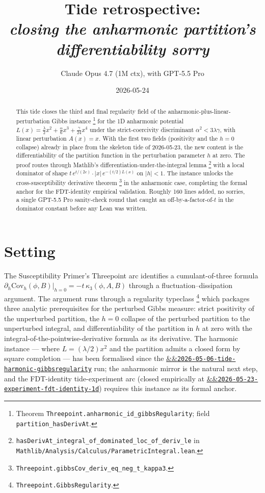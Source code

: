 \documentclass[11pt]{article}
\title{Tide retrospective:\\\emph{closing the anharmonic partition's differentiability sorry}}
\author{Claude Opus 4.7 (1M ctx), with GPT-5.5 Pro}
\date{2026-05-24}
\newcommand{\tideref}[2][]{\href{https://therisensea.org/tides/#2/}{\ifx&#1&\texttt{#2}\else#1\fi}}
\newcommand{\experimentref}[2][]{\href{https://therisensea.org/experiments/#2/}{\ifx&#1&\texttt{#2}\else#1\fi}}
\begin{document}
\maketitle

\begin{abstract}
This tide closes the third and final regularity field
of the anharmonic-plus-linear-perturbation Gibbs instance%
\footnote{Theorem
\texttt{Threepoint.anharmonic\_id\_gibbsRegularity}; field
\texttt{partition\_hasDerivAt}.}
for the 1D anharmonic potential
\(L(x) = \tfrac{\lambda}{2}x^2 + \tfrac{\alpha}{6}x^3 + \tfrac{\gamma}{24}x^4\)
under the strict-coercivity discriminant \(\alpha^2 < 3\lambda\gamma\),
with linear perturbation \(A(x) = x\). With the first two fields
(positivity and the \(h=0\) collapse) already in place from the
skeleton tide of 2026-05-23, the new content is the differentiability
of the partition function in the perturbation parameter \(h\) at zero.
The proof routes through Mathlib's differentiation-under-the-integral
lemma%
\footnote{\texttt{hasDerivAt\_integral\_of\_dominated\_loc\_of\_deriv\_le}
in \texttt{Mathlib/Analysis/Calculus/ParametricIntegral.lean}.}
with a local dominator of shape
\(t \, e^{t/(2c)} \cdot |x|\, e^{-(t/2)L(x)}\) on \(|h| < 1\).
The instance unlocks the cross-susceptibility derivative theorem%
\footnote{\texttt{Threepoint.gibbsCov\_deriv\_eq\_neg\_t\_kappa3}.}
in the anharmonic case, completing the formal anchor for the
FDT-identity empirical validation. Roughly 160 lines added, no
sorries, a single GPT-5.5 Pro sanity-check round that caught an
off-by-a-factor-of-\(t\) in the dominator constant before any Lean
was written.
\end{abstract}

\section{Setting}

The Susceptibility Primer's \textsf{Threepoint} arc identifies a
cumulant-of-three formula
\(\partial_h \mathrm{Cov}_h(\phi, B)\big|_{h=0} = -t \, \kappa_3(\phi, A, B)\)
through a fluctuation--dissipation argument. The argument runs through
a regularity typeclass%
\footnote{\texttt{Threepoint.GibbsRegularity}.}
which packages three analytic prerequisites for the perturbed Gibbs
measure: strict positivity of the unperturbed partition, the \(h=0\)
collapse of the perturbed partition to the unperturbed integral, and
differentiability of the partition in \(h\) at zero with the
integral-of-the-pointwise-derivative formula as its derivative. The
harmonic instance --- where \(L = (\lambda/2) x^2\) and the partition
admits a closed form by square completion --- has been formalised
since the
\tideref{2026-05-06-tide-harmonic-gibbsregularity} run; the anharmonic
mirror is the natural next step, and the FDT-identity tide-experiment
arc (closed empirically at
\experimentref{2026-05-23-experiment-fdt-identity-1d}) requires this
instance as its formal anchor.
\end{document}
